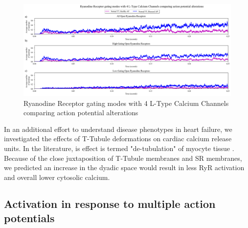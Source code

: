 \documentclass[12pt]{ucsddissertation}
\begin{document}
\setcounter{figure}{10}
\begin{figure}
\centering
	\includegraphics[scale=0.4]{hnhd4RyR_r_Comparison.png}	\caption{Ryanodine Receptor gating modes with 4 L-Type Calcium Channels comparing action potential alterations}
\label{fig:hnhd 4 LTCC 1 AP RyR} 
\end{figure}

In an additional effort to understand disease phenotypes in heart failure, we investigated the effects of T-Tubule deformations on cardiac calcium release units. In the literature, is effect is termed "de-tubulation" of myocyte tissue \cite{Louch2010}. Because of the close juxtaposition of T-Tubule membranes and SR membranes, we predicted an increase in the dyadic space would result in less RyR activation and overall lower cytosolic calcium. 

\subsection{Activation in response to multiple action potentials}
\end{document}
